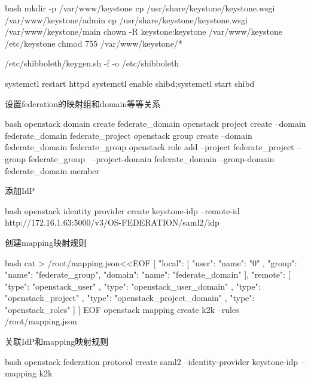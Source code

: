 \begin{code-block}{bash}
mkdir -p /var/www/keystone
cp /usr/share/keystone/keystone.wsgi /var/www/keystone/admin
cp /usr/share/keystone/keystone.wsgi /var/www/keystone/main
chown -R keystone:keystone /var/www/keystone /etc/keystone
chmod 755 /var/www/keystone/*

/etc/shibboleth/keygen.sh  -f  -o /etc/shibboleth

systemctl restart httpd
systemctl enable shibd;systemctl start shibd
\end{code-block}

设置federation的映射组和domain等等关系
\begin{code-block}{bash}
openstack domain create federate_domain
openstack project create --domain federate_domain federate_project
openstack group create --domain federate_domain federate_group
openstack role add --project federate_project --group federate_group \
    --project-domain federate_domain --group-domain federate_domain member
\end{code-block}

添加IdP
\begin{code-block}{bash}
openstack identity provider create keystone-idp --remote-id http://172.16.1.63:5000/v3/OS-FEDERATION/saml2/idp
\end{code-block}

创建mapping映射规则
\begin{code-block}{bash}
cat > /root/mapping.json<<EOF
[
    {
        "local": [
            {
                "user": {
                    "name": "{0}"
                },
                "group": {
                    "name": "federate_group",
                    "domain": {
                        "name": "federate_domain"
                    }
                }
            }
        ],
        "remote": [
            {
                "type": "openstack_user"
            },
            {
                "type": "openstack_user_domain"
            },
            {
                "type": "openstack_project"
            },
            {
                "type": "openstack_project_domain"
            },
            {
                "type": "openstack_roles"
            }
        ]
    }
]
EOF
openstack mapping create k2k --rules /root/mapping.json
\end{code-block}

关联IdP和mapping映射规则
\begin{code-block}{bash}
openstack federation protocol create saml2 --identity-provider keystone-idp --mapping k2k
\end{code-block}

